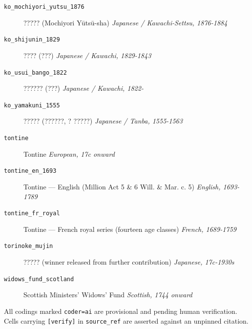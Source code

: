\documentclass[11pt,a4paper]{article}
\begin{document}
\begin{description}
\item[\texttt{ko\_mochiyori\_yutsu\_1876}] ????? (Mochiyori Y\=uts\=u-sha) \hfill \textit{Japanese / Kawachi-Settsu, 1876-1884}
\item[\texttt{ko\_shijunin\_1829}] ???? (???) \hfill \textit{Japanese / Kawachi, 1829-1843}
\item[\texttt{ko\_usui\_bango\_1822}] ?????? (???) \hfill \textit{Japanese / Kawachi, 1822-}
\item[\texttt{ko\_yamakuni\_1555}] ????? (??????, ? ?????) \hfill \textit{Japanese / Tanba, 1555-1563}
\item[\texttt{tontine}] Tontine \hfill \textit{European, 17c onward}
\item[\texttt{tontine\_en\_1693}] Tontine --- English (Million Act 5 \& 6 Will. \& Mar. c. 5) \hfill \textit{English, 1693-1789}
\item[\texttt{tontine\_fr\_royal}] Tontine --- French royal series (fourteen age classes) \hfill \textit{French, 1689-1759}
\item[\texttt{torinoke\_mujin}] ????? (winner released from further contribution) \hfill \textit{Japanese, 17c-1930s}
\item[\texttt{widows\_fund\_scotland}] Scottish Ministers' Widows' Fund \hfill \textit{Scottish, 1744 onward}
\end{description}
\vfill\footnotesize All codings marked \texttt{coder=ai} are provisional and pending human verification. Cells carrying \texttt{[verify]} in \texttt{source\_ref} are asserted against an unpinned citation.
\end{document}
